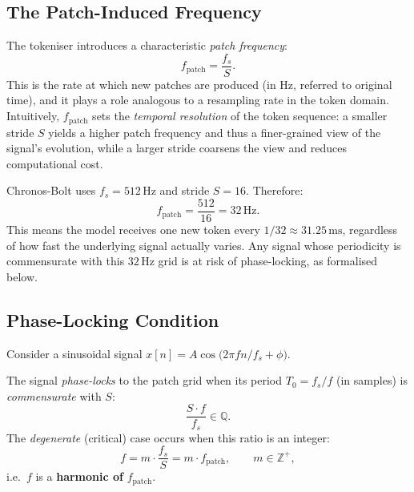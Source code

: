 \subsection{The Patch-Induced Frequency}

The tokeniser introduces a characteristic \emph{patch frequency}:
\begin{equation}
	f_{\mathrm{patch}} = \frac{f_s}{S}.
\end{equation}
This is the rate at which new patches are produced (in Hz, referred to original time),
and it plays a role analogous to a resampling rate in the token domain.
Intuitively, $f_{\mathrm{patch}}$ sets the \emph{temporal resolution} of the token
sequence: a smaller stride $S$ yields a higher patch frequency and thus a finer-grained
view of the signal's evolution, while a larger stride coarsens the view and reduces
computational cost.

\begin{example}
	Chronos-Bolt uses $f_s = 512\,\text{Hz}$ and stride $S = 16$.
	Therefore:
	\[
	f_{\mathrm{patch}} = \frac{512}{16} = 32\,\text{Hz}.
	\]
	This means the model receives one new token every $1/32 \approx 31.25\,\text{ms}$,
	regardless of how fast the underlying signal actually varies.
	Any signal whose periodicity is commensurate with this $32\,\text{Hz}$ grid is at risk
	of phase-locking, as formalised below.
\end{example}

\subsection{Phase-Locking Condition}

Consider a sinusoidal signal $x[n] = A\cos\!\bigl(2\pi f n / f_s + \phi\bigr)$.

\begin{definition}
	The signal \emph{phase-locks} to the patch grid when its period $T_0 = f_s/f$
	(in samples) is \emph{commensurate} with $S$:
	\begin{equation}
		\frac{S \cdot f}{f_s} \in \mathbb{Q}.
	\end{equation}
	The \emph{degenerate} (critical) case occurs when this ratio is an integer:
	\begin{equation}
		f = m \cdot \frac{f_s}{S} = m \cdot f_{\mathrm{patch}},
		\qquad m \in \mathbb{Z}^+,
	\end{equation}
	i.e.\ $f$ is a \textbf{harmonic of} $f_{\mathrm{patch}}$.
\end{definition}

